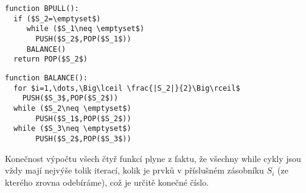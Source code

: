 \documentclass[12pt,a4paper]{article}
\theoremstyle{plain}
\begin{document}
\begin{enumerate}[a)]
\begin{lstlisting}[mathescape]
function BPULL():
  if ($S_2=\emptyset$)   
     while ($S_1\neq \emptyset$)
       PUSH($S_2$,POP($S_1$)) 
     BALANCE()
  return POP($S_2$)
\end{lstlisting}

\begin{lstlisting}[mathescape]
function BALANCE():
  for $i=1,\dots,\Big\lceil \frac{|S_2|}{2}\Big\rceil$
    PUSH($S_3$,POP($S_2$))   
  while ($S_2\neq \emptyset$)
       PUSH($S_1$,POP($S_2$))
  while ($S_3\neq \emptyset$)
       PUSH($S_2$,POP($S_3$))  
\end{lstlisting}
Konečnost výpočtu všech čtyř funkcí plyne z faktu, že všechny while cykly jsou vždy mají nejvýše tolik iterací, kolik je prvků v příslušném zásobníku $S_i$ (ze kterého zrovna odebíráme), což je určitě konečné číslo.\\


\end{enumerate}
\end{document}
